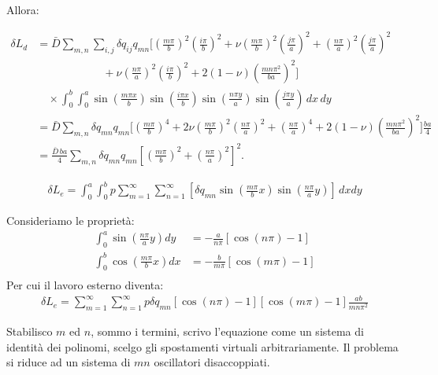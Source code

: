 Allora:

\begin{align*}
\delta L_d
&= \bar{D}\!\!\sum_{m,n}\sum_{i,j}\! \delta q_{ij} q_{mn}\!
\Bigg[
\left(\frac{m\pi}{b}\right)^2\!\left(\frac{i\pi}{b}\right)^2
+ \nu \left(\frac{m\pi}{b}\right)^2\!\left(\frac{j\pi}{a}\right)^2
+ \left(\frac{n\pi}{a}\right)^2\!\left(\frac{j\pi}{a}\right)^2 \\
&\qquad\qquad\qquad
+ \nu \left(\frac{n\pi}{a}\right)^2\!\left(\frac{i\pi}{b}\right)^2
+ 2(1-\nu)\left(\frac{mn\pi^2}{ba}\right)^2
\Bigg]
\\[-2mm]
&\quad\times \int_0^b\!\!\int_0^a
\sin\!\left(\frac{m\pi x}{b}\right)\sin\!\left(\frac{i\pi x}{b}\right)
\sin\!\left(\frac{n\pi y}{a}\right)\sin\!\left(\frac{j\pi y}{a}\right)\,dx\,dy
\\[1mm]
&= \bar{D}\!\!\sum_{m,n}\! \delta q_{mn} q_{mn}\!
\Bigg[
\left(\frac{m\pi}{b}\right)^4
+ 2\nu \left(\frac{m\pi}{b}\right)^2\!\left(\frac{n\pi}{a}\right)^2
+ \left(\frac{n\pi}{a}\right)^4
+ 2(1-\nu)\left(\frac{mn\pi^2}{ba}\right)^2
\Bigg]\frac{ba}{4}
\\
&= \frac{\bar{D}\,ba}{4}\sum_{m,n}\delta q_{mn} q_{mn}
\left[
\left(\frac{m\pi}{b}\right)^2 + \left(\frac{n\pi}{a}\right)^2
\right]^2.
\end{align*}

\begin{align*}
    \delta L_e=\int_0^a\int_0^b   p   \sum^\infty_{m=1} \sum^\infty_{n=1}  \left[ \delta q_{mn}\sin{\left(\frac{m\pi}{b}x\right)} \sin{\left(\frac{n\pi}{a}y\right)}  \right]          \,dxdy
\end{align*}

Consideriamo le proprietà:
\begin{align*}
    \int_0^a \sin{\left(\frac{n\pi}{a}y\right)}dy&=-\frac{a}{n\pi} \left[ \cos{(n\pi)-1}\right]  \\
     \int_0^b \cos{\left(\frac{m\pi}{b}x\right)}dx&=-\frac{b}{m\pi} \left[ \cos{(m\pi)-1}\right]  \\
\end{align*}
Per cui il lavoro esterno diventa:
\begin{align*}
    \delta L_e= \sum^\infty_{m=1} \sum^\infty_{n=1} p \delta q_{mn}  \left[ \cos{(n\pi)-1}\right]\left[ \cos{(m\pi)-1}\right]\frac{ab}{mn\pi^2}
\end{align*}

Stabilisco $m$ ed $n$, sommo i termini, scrivo l'equazione come un sistema di identità dei polinomi, scelgo gli spostamenti virtuali arbitrariamente. Il problema si riduce ad un sistema di $mn$ oscillatori disaccoppiati.